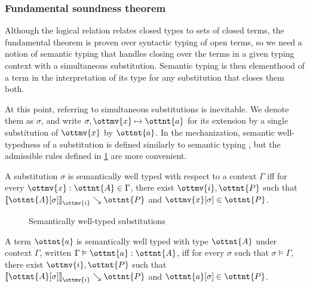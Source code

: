 \documentclass[a4paper,UKenglish,cleveref,autoref,thm-restate]{lipics-v2021}
\begin{document}
\subsubsection{Fundamental soundness theorem}

Although the logical relation relates closed types to sets of closed terms,
the fundamental theorem is proven over syntactic typing of open terms,
so we need a notion of semantic typing that handles closing over the terms
in a given typing context with a simultaneous substitution.
Semantic typing is then elementhood of a term in the interpretation of its type
for any substitution that closes them both.

At this point, referring to simultaneous substitutions is inevitable.
We denote them as $\sigma$, and write $ \sigma ,  \ottmv{x}  \mapsto  \ottnt{a} $
for its extension by a single substitution of $\ottmv{x}$ by $\ottnt{a}$.
In the mechanization, semantic well-typedness of a substitution \fbox{$ \sigma  \vDash  \Gamma $}
is defined similarly to semantic typing ,
but the admissible rules defined in \cref{fig:sem:subst} are more convenient.

\begin{definition}
  A substitution $\sigma$ is semantically well typed
  with respect to a context $\Gamma$ iff for every $ \ottmv{x}  \mathrel{:}  \ottnt{A}  \in  \Gamma $,
  there exist $\ottmv{i}, \ottnt{P}$ such that
  $ \mathopen{\llbracket}   \ottnt{A} [  \sigma  ]   \mathclose{\rrbracket}_{ \ottmv{i} } \searrow  \ottnt{P} $ and $  \ottmv{x} [  \sigma  ]   \in  \ottnt{P} $.
\end{definition}

\begin{figure}
\caption{Semantically well-typed substitutions}
\label{fig:sem:subst}
\end{figure}

\begin{definition}
  A term $\ottnt{a}$ is semantically well typed with type $\ottnt{A}$ under context $\Gamma$,
  written $ \Gamma  \vDash  \ottnt{a}  :  \ottnt{A} $, iff for every $\sigma$ such that $ \sigma  \vDash  \Gamma $,
  there exist $\ottmv{i}, \ottnt{P}$ such that
  $ \mathopen{\llbracket}   \ottnt{A} [  \sigma  ]   \mathclose{\rrbracket}_{ \ottmv{i} } \searrow  \ottnt{P} $ and $  \ottnt{a} [  \sigma  ]   \in  \ottnt{P} $.
\end{definition}
\end{document}
